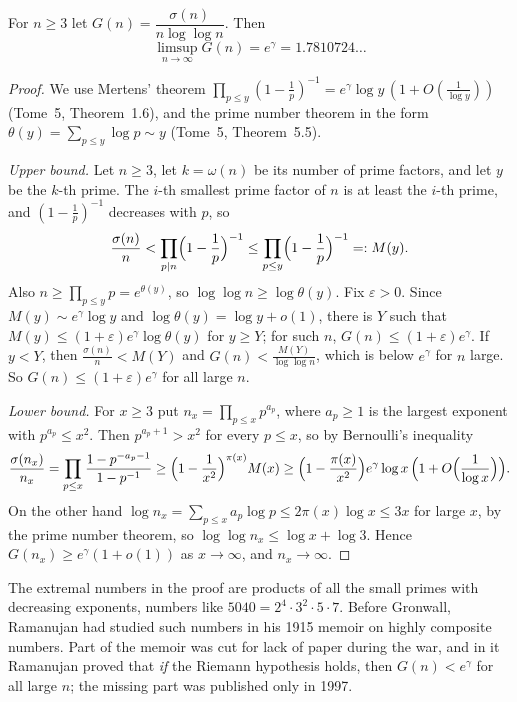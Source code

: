 \begin{theorem}[Gronwall, 1913]\label{thm:gronwall}
For $n\ge3$ let $G(n)=\dfrac{\sigma(n)}{n\log\log n}$. Then
\[
\limsup_{n\to\infty}G(n)=e^\gamma=1.7810724\ldots
\]
\end{theorem}
\begin{proof}
We use Mertens' theorem $\prod_{p\le y}(1-\frac1p)^{-1}=e^\gamma\log y\,(1+O(\frac1{\log y}))$ (Tome~5, Theorem~1.6), and the prime number theorem in the
form $\theta(y)=\sum_{p\le y}\log p\sim y$ (Tome~5, Theorem~5.5).

\emph{Upper bound.} Let $n\ge3$, let $k=\omega(n)$ be its number of prime factors, and let $y$ be the $k$-th prime. The $i$-th smallest prime factor of $n$
is at least the $i$-th prime, and $(1-\frac1p)^{-1}$ decreases with $p$, so
\[
\frac{\sigma(n)}n<\prod_{p\mid n}\Bigl(1-\frac1p\Bigr)^{-1}\le\prod_{p\le y}\Bigl(1-\frac1p\Bigr)^{-1}=:M(y).
\]
Also $n\ge\prod_{p\le y}p=e^{\theta(y)}$, so $\log\log n\ge\log\theta(y)$. Fix $\varepsilon>0$. Since $M(y)\sim e^\gamma\log y$ and $\log\theta(y)=\log y+o(1)$,
there is $Y$ such that $M(y)\le(1+\varepsilon)e^\gamma\log\theta(y)$ for $y\ge Y$; for such $n$, $G(n)\le(1+\varepsilon)e^\gamma$. If $y<Y$, then
$\frac{\sigma(n)}n<M(Y)$ and $G(n)<\frac{M(Y)}{\log\log n}$, which is below $e^\gamma$ for $n$ large. So $G(n)\le(1+\varepsilon)e^\gamma$ for all large $n$.

\emph{Lower bound.} For $x\ge3$ put $n_x=\prod_{p\le x}p^{a_p}$, where $a_p\ge1$ is the largest exponent with $p^{a_p}\le x^2$. Then $p^{a_p+1}>x^2$ for every
$p\le x$, so by Bernoulli's inequality
\[
\frac{\sigma(n_x)}{n_x}=\prod_{p\le x}\frac{1-p^{-a_p-1}}{1-p^{-1}}\ge\Bigl(1-\frac1{x^2}\Bigr)^{\pi(x)}M(x)\ge\Bigl(1-\frac{\pi(x)}{x^2}\Bigr)e^\gamma\log x\,\Bigl(1+O\Bigl(\frac1{\log x}\Bigr)\Bigr).
\]
On the other hand $\log n_x=\sum_{p\le x}a_p\log p\le2\pi(x)\log x\le3x$ for large $x$, by the prime number theorem, so $\log\log n_x\le\log x+\log3$.
Hence $G(n_x)\ge e^\gamma(1+o(1))$ as $x\to\infty$, and $n_x\to\infty$.
\end{proof}

The extremal numbers in the proof are products of all the small primes with decreasing exponents, numbers like $5040=2^4\cdot3^2\cdot5\cdot7$. Before
Gronwall, Ramanujan had studied such numbers in his 1915 memoir on highly composite numbers. Part of the memoir was cut for lack of paper during the war,
and in it Ramanujan proved that \emph{if} the Riemann hypothesis holds, then $G(n)<e^\gamma$ for all large $n$; the missing part was published only in
1997.

